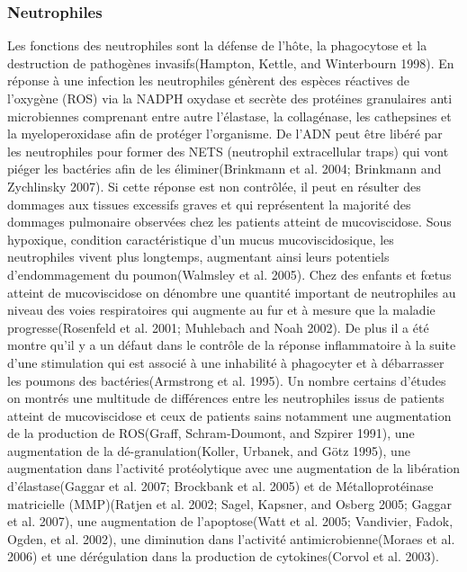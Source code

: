 			\subsubsection{Neutrophiles }
Les fonctions des neutrophiles sont la défense de l’hôte, la phagocytose et la destruction de pathogènes invasifs(Hampton, Kettle, and Winterbourn 1998)\cite{hampton_inside_1998}. En réponse à une infection les neutrophiles génèrent des espèces réactives de l’oxygène (ROS) via la NADPH oxydase et secrète des protéines granulaires anti microbiennes comprenant entre autre l’élastase, la collagénase, les cathepsines et la myeloperoxidase afin de protéger l’organisme. De l’ADN peut être libéré par les neutrophiles pour former des NETS (neutrophil extracellular traps) qui vont piéger les bactéries afin de les éliminer(Brinkmann et al. 2004; Brinkmann and Zychlinsky 2007)\cite{brinkmann_neutrophil_2004}\cite{brinkmann_beneficial_2007}. Si cette réponse est non contrôlée, il peut en résulter des dommages aux tissues excessifs graves et qui représentent la majorité des dommages pulmonaire observées chez les patients atteint de mucoviscidose. Sous hypoxique, condition caractéristique d’un mucus mucoviscidosique, les neutrophiles vivent plus longtemps, augmentant ainsi leurs potentiels d’endommagement du poumon(Walmsley et al. 2005)\cite{walmsley_hypoxia-induced_2005}. Chez des enfants et fœtus atteint de mucoviscidose on dénombre une quantité important de neutrophiles au niveau des voies respiratoires qui augmente au fur et à mesure que la maladie progresse(Rosenfeld et al. 2001; Muhlebach and Noah 2002)\cite{rosenfeld_early_2001}\cite{muhlebach_endotoxin_2002}. De plus il a été montre qu’il y a un défaut dans le contrôle de la réponse inflammatoire à la suite d’une stimulation qui est associé à une inhabilité à phagocyter et à débarrasser les poumons des bactéries(Armstrong et al. 1995)\cite{armstrong_lower_1995}. Un nombre certains d’études on montrés une multitude de différences entre les neutrophiles issus de patients atteint de mucoviscidose et ceux de patients sains notamment une augmentation de la production de ROS(Graff, Schram-Doumont, and Szpirer 1991)\cite{graff_defective_1991}, une augmentation de la dé-granulation(Koller, Urbanek, and Götz 1995)\cite{koller_increased_1995}, une augmentation dans l’activité protéolytique avec une augmentation de la libération d’élastase(Gaggar et al. 2007; Brockbank et al. 2005)\cite{gaggar_matrix_2007}\cite{brockbank_effect_2005} et de Métalloprotéinase matricielle (MMP)(Ratjen et al. 2002; Sagel, Kapsner, and Osberg 2005; Gaggar et al. 2007)\cite{ratjen_matrix_2002}\cite{sagel_induced_2005}\cite{gaggar_matrix_2007}, une augmentation de l’apoptose(Watt et al. 2005; Vandivier, Fadok, Ogden, et al. 2002)\cite{watt_neutrophil_2005}\cite{vandivier_impaired_2002}, une diminution dans l’activité antimicrobienne(Moraes et al. 2006) \cite{moraes_abnormalities_2006}et une dérégulation dans la production de cytokines(Corvol et al. 2003)\cite{corvol_distinct_2003}.

